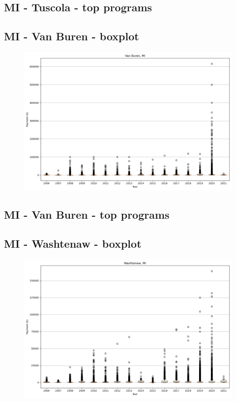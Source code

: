 \subsection*{MI - Tuscola - top programs}

\newpage
\subsection*{MI - Van Buren - boxplot}
\begin{figure}[h]
\centering
\includegraphics[width=7in]{../output/boxplots/counties/Van Buren-MI_boxplot.png}
\end{figure}


\subsection*{MI - Van Buren - top programs}

\newpage
\subsection*{MI - Washtenaw - boxplot}
\begin{figure}[h]
\centering
\includegraphics[width=7in]{../output/boxplots/counties/Washtenaw-MI_boxplot.png}
\end{figure}


